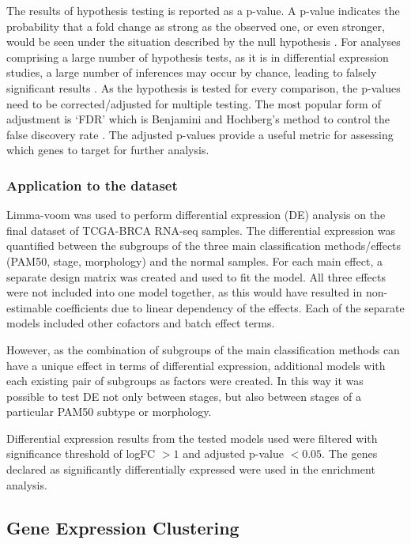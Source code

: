         The results of hypothesis testing is reported as a p-value. A p-value indicates the probability that a fold change as strong as the observed one, or even stronger, would be seen under the situation described by the null hypothesis  \cite{Love2016RNA-SeqApproved}.  For analyses comprising a large number of hypothesis tests, as it is in differential expression studies, a large number of inferences may occur by chance, leading to falsely significant results \cite{pounds2006estimation}. As the hypothesis is tested for every comparison, the p-values need to be corrected/adjusted for multiple testing. The most popular form of adjustment is ‘FDR’ which is Benjamini and Hochberg’s method to control the false discovery rate \cite{BH1995}. The adjusted p-values provide a useful metric for assessing which genes to target for further analysis.



        \subsubsection{Application to the dataset}
        Limma-voom was used to perform differential expression (DE) analysis on the final dataset of TCGA-BRCA RNA-seq samples. The differential expression was quantified between the subgroups of the three main classification methods/effects (PAM50, stage, morphology) and the normal samples. 
        For each main effect, a separate design matrix was created and used to fit the model. All three effects were not included into one model together, as this would have resulted in non-estimable coefficients due to linear dependency of the effects. Each of the separate models included other cofactors and batch effect terms. 
        
        However, as the combination of subgroups of the main classification methods can have a unique effect in terms of differential expression, additional models with each existing pair of subgroups as factors were created. In this way it was possible to test DE not only between stages, but also between stages of a particular PAM50 subtype or morphology. 
        
        Differential expression results from the tested models used were filtered with significance threshold of logFC $>1$ and adjusted p-value $<0.05$. The genes declared as significantly differentially expressed were used in the enrichment analysis. 
        
        


    \newpage
    \subsection{Gene Expression Clustering}
    

